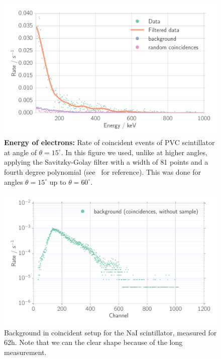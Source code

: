 \begin{figure}[htpb]
    \centering
    \includegraphics[width=0.9\linewidth]{./analysis/figures/coin_ps_15_filter_}
    \caption{\textbf{Energy of electrons:}
        Rate of coincident events of 
        PVC scintillator at angle of $\theta = 15^\circ$.
        In this figure we used, unlike at higher angles, applying the Savitzky-Golay filter
        with a width of 81 points and a fourth
        degree polynomial (see~\cite{scipy} for reference). This was done for 
        angles $\theta = 15^\circ$ up to $\theta = 60^\circ$.}
\label{fig:coin_ps_15}
\end{figure}
\begin{figure}[htpb]
    \centering
    \includegraphics[width=0.9\linewidth]{./analysis/figures/coin_na_background}
    \caption{Background in coincident setup for the NaI scintillator, measured for 62h. Note that we can the clear shape because of the long measurement. } \label{fig:coin_na_background}
\end{figure}
